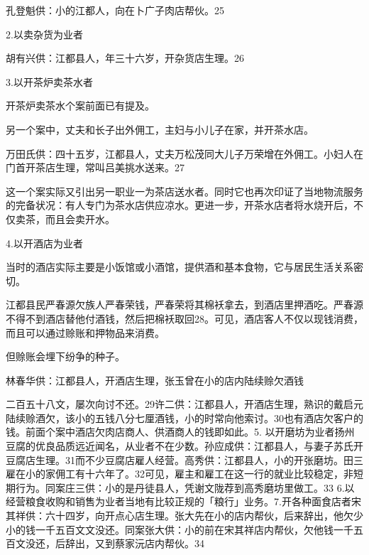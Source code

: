 \begin{BookQuote}
孔登魁供：小的江都人，向在卜广子肉店帮伙。25
\end{BookQuote}

2.以卖杂货为业者

\begin{BookQuote}
胡有兴供：江都县人，年三十六岁，开杂货店生理。26
\end{BookQuote}

3.以开茶炉卖茶水者

开茶炉卖茶水个案前面已有提及。

另一个案中，丈夫和长子出外佣工，主妇与小儿子在家，并开茶水店。

\begin{BookQuote}
万田氏供：四十五岁，江都县人，丈夫万松茂同大儿子万荣增在外佣工。小妇人在门首开茶店生理，常叫吕美挑水送来。27
\end{BookQuote}

这一个案实际又引出另一职业一为茶店送水者。同时它也再次印证了当地物流服务的完备状况：有人专门为茶水店供应凉水。更进一步，开茶水店者将水烧开后，不仅卖茶，而且会卖开水。

4.以开酒店为业者

当时的酒店实际主要是小饭馆或小酒馆，提供酒和基本食物，它与居民生活关系密切。

江都县民严春源欠族人严春荣钱，严春荣将其棉袄拿去，到酒店里押酒吃。严春源不得不到酒店替他付酒钱，然后把棉袄取回28。可见，酒店客人不仅以现钱消费，而且可以通过赊账和押物品来消费。

但赊账会埋下纷争的种子。

\begin{BookQuote}
林春华供：江都县人，开酒店生理，张玉曾在小的店内陆续赊欠酒钱
\end{BookQuote}

\vfill
\begin{BookNotes}
\end{BookNotes}

\noindent 二百五十八文，屡次向讨不还。29许二供：江都县人，开酒店生理，熟识的戴启元陆续赊酒欠，该小的五钱八分七厘酒钱，小的时常向他索讨。30也有酒店欠客户的钱。前面个案中酒店欠肉店商人、供酒商人的钱即如此。5. 以开磨坊为业者扬州豆腐的优良品质远近闻名，从业者不在少数。孙应成供：江都县人，与妻子苏氏开豆腐店生理。31而不少豆腐店雇人经营。高秀供：江都县人，小的开张磨坊。田三雇在小的家佣工有十六年了。32可见，雇主和雇工在这一行的就业比较稳定，非短期行为。同案庄三供：小的是丹徒县人，凭谢文陇荐到高秀磨坊里做工。33 6.以经营粮食收购和销售为业者当地有比较正规的「粮行」业务。7.开各种面食店者宋其祥供：六十四岁，向开点心店生理。张大先在小的店内帮伙，后来辞出，他欠少小的钱一千五百文文没还。同案张大供：小的前在宋其祥店内帮伙，欠他钱一千五百文没还，后辞出，又到蔡家沅店内帮伙。34

